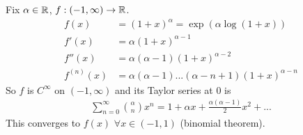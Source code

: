 \documentclass[a4paper]{article}
\begin{document}
\begin{eg}
Fix $\alpha \in \mathbb{R}$, $f:\left(-1,\infty\right)\to\mathbb{R}$.
\begin{equation*}
\begin{aligned}
f\left(x\right) &= \left(1+x\right)^\alpha = \exp\left(\alpha \log\left(1+x\right)\right)\\
f'\left(x\right) &= \alpha \left(1+x\right)^{\alpha-1}\\
f''\left(x\right) &= \alpha\left(\alpha-1\right)\left(1+x\right)^{\alpha-2}\\
f^{\left(n\right)}\left(x\right) &= \alpha\left(\alpha - 1\right)...\left(\alpha - n + 1\right)\left(1+x\right)^{\alpha-n}
\end{aligned}
\end{equation*}
So $f$ is $C^\infty$ on $\left(-1,\infty\right)$ and its Taylor series at 0 is
\begin{equation*}
\begin{aligned}
\sum_{n=0}^\infty {\alpha \choose n} x^n = 1+\alpha x + \frac{\alpha\left(\alpha-1\right)}{2}x^2+...
\end{aligned}
\end{equation*}
This converges to $f\left(x\right)$ $\forall x\in\left(-1,1\right)$ (binomial theorem).
\end{eg}
\end{document}
